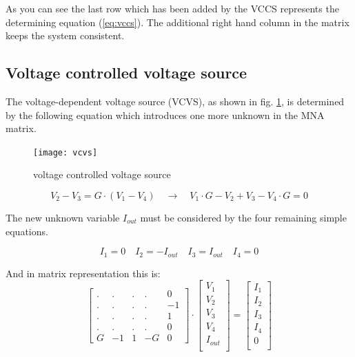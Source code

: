 \documentclass[10pt]{report}
\begin{document}
As you can see the last row which has been added by the VCCS
represents the determining equation (\ref{eq:vccs}).  The additional
right hand column in the matrix keeps the system consistent.

\subsection{Voltage controlled voltage source}

The voltage-dependent voltage source (VCVS), as shown in fig.
\ref{fig:vcvs}, is determined by the following equation which
introduces one more unknown in the MNA matrix.

\begin{figure}[ht]
\begin{center}
\texttt{[image: vcvs]}
\end{center}
\caption{voltage controlled voltage source}
\label{fig:vcvs}
\end{figure}
\FloatBarrier

\begin{equation}
V_{2} - V_{3} = G\cdot \left(V_{1} - V_{4}\right)
\quad \rightarrow \quad
V_{1}\cdot G - V_{2} + V_{3} - V_{4}\cdot G = 0
\label{eq:vcvs}
\end{equation}

The new unknown variable $I_{out}$ must be considered by the four
remaining simple equations.

\begin{equation}
I_{1} = 0 \quad I_{2} = -I_{out} \quad I_{3} = I_{out} \quad I_{4} = 0
\end{equation}

And in matrix representation this is:
\begin{equation}
\begin{bmatrix}
.&.&.&.& 0\\
.&.&.&.& -1\\
.&.&.&.& 1\\
.&.&.&.& 0\\
G & -1 & 1 & -G & 0
\end{bmatrix}
\cdot
\begin{bmatrix}
V_{1}\\
V_{2}\\
V_{3}\\
V_{4}\\
I_{out}\\
\end{bmatrix}
=
\begin{bmatrix}
I_{1}\\
I_{2}\\
I_{3}\\
I_{4}\\
0\\
\end{bmatrix}
\end{equation}
\end{document}
